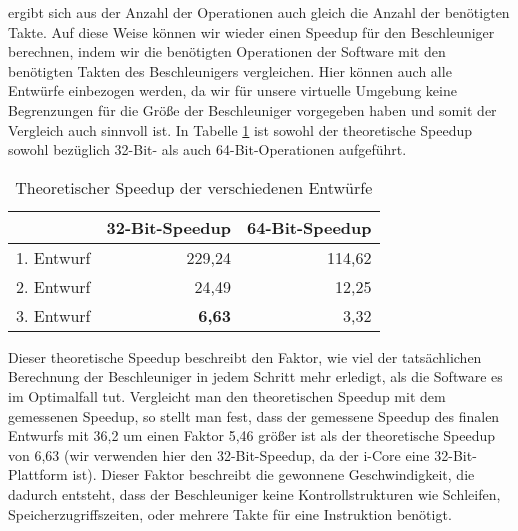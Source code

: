 ergibt sich aus der Anzahl der Operationen auch gleich die Anzahl der benötigten Takte.
Auf diese Weise können wir wieder einen Speedup für den Beschleuniger berechnen, indem wir die benötigten Operationen
der Software mit den benötigten Takten des Beschleunigers vergleichen. Hier können auch alle Entwürfe einbezogen werden,
da wir für unsere virtuelle Umgebung keine Begrenzungen für die Größe der Beschleuniger vorgegeben haben und somit der Vergleich auch sinnvoll ist.
In Tabelle \ref{tab:theoretischer_speedup} ist sowohl der theoretische Speedup sowohl bezüglich 32-Bit- als auch 64-Bit-Operationen aufgeführt.
\begin{table}
    \centering
    \begin{tabular}{lrr}
        & 32-Bit-Speedup & 64-Bit-Speedup \\
        \hline
        1. Entwurf & 229,24 & 114,62 \\
        2. Entwurf & 24,49 & 12,25 \\
        3. Entwurf & \textbf{6,63} & 3,32
    \end{tabular}
    \label{tab:theoretischer_speedup}
    \caption{Theoretischer Speedup der verschiedenen Entwürfe}
\end{table}
Dieser theoretische Speedup beschreibt den Faktor, wie viel der tatsächlichen Berechnung der Beschleuniger in jedem Schritt mehr erledigt,
als die Software es im Optimalfall tut. Vergleicht man den theoretischen Speedup mit dem gemessenen Speedup, so stellt man fest,
dass der gemessene Speedup des finalen Entwurfs mit 36,2 um einen Faktor 5,46 größer ist als der theoretische Speedup von 6,63
(wir verwenden hier den 32-Bit-Speedup, da der i-Core eine 32-Bit-Plattform ist). Dieser Faktor beschreibt die gewonnene Geschwindigkeit,
die dadurch entsteht, dass der Beschleuniger keine Kontrollstrukturen wie Schleifen, Speicherzugriffszeiten, oder mehrere Takte für eine Instruktion benötigt.
